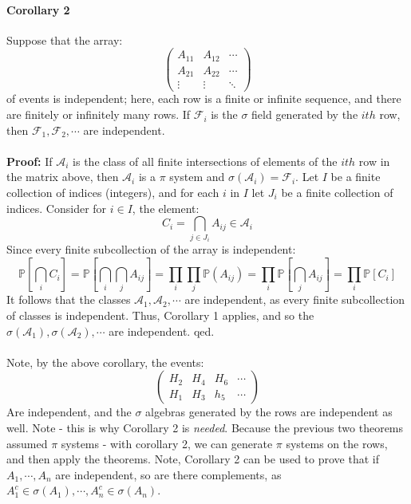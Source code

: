 \documentclass[12pt,a4paper]{article}
\newcommand{\1}[1]{\mathbbm{1}\left\{ #1 \right\}}
\newcommand{\acal}{\mathcal{A}}
\newcommand{\fcal}{\mathcal{F}}
\newcommand{\Prob}{\mathbb{P}}
\begin{document}
\paragraph{Corollary 2} Suppose that the array:
$$
	\begin{pmatrix}
	A_{11} & A_{12} & \cdots\\
	A_{21} & A_{22} & \cdots\\
	\vdots & \vdots & \ddots
	\end{pmatrix}
$$
of events is independent; here, each row is a finite or infinite sequence, and there are finitely or infinitely many rows. If $\fcal_i$ is the $\sigma$ field generated by the $ith$ row, then $\fcal_1, \fcal_2, \cdots$ are independent.
\\\\
\textbf{Proof:} If $\acal_i$ is the class of all finite intersections of elements of the $ith$ row in the matrix above, then $\acal_i$ is a $\pi$ system and $\sigma(\acal_i) = \fcal_i$. Let $I$ be a finite collection of indices (integers), and for each $i$ in $I$ let $J_i$ be a finite collection of indices. Consider for $i \in I$, the element:
$$
	C_i = \bigcap_{j \in J_i} A_{ij} \in \acal_i
$$
Since every finite subcollection of the array is independent:
$$
	\Prob\left[\bigcap_i C_i\right] =
	\Prob\left[\bigcap_i \bigcap_j A_{ij}\right] =
	\prod_i \prod_j \Prob(A_{ij}) = \prod_i \Prob\left[\bigcap_j A_{ij}\right] =
	\prod_i \Prob\left[C_i\right]
$$
It follows that the classes $\acal_1, \acal_2, \cdots$ are independent, as every finite subcollection of classes is independent. Thus, Corollary 1 applies, and so the $\sigma(\acal_1), \sigma(\acal_2), \cdots$ are independent. qed.
\\\\
Note, by the above corollary, the events:
$$
	\begin{pmatrix}
	H_2 & H_4 & H_6 & \cdots\\
	H_1 & H_3 & h_5 & \cdots
	\end{pmatrix}
$$
Are independent, and the $\sigma$ algebras generated by the rows are independent as well. Note - this is why Corollary 2 is \textit{needed}. Because the previous two theorems assumed $\pi$ systems - with corollary 2, we can generate $\pi$ systems on the rows, and then apply the theorems. Note, Corollary 2 can be used to prove that if $A_1, \cdots, A_n$ are independent, so are there complements, as $A_1^c \in \sigma(A_1), \cdots, A_n^c \in \sigma(A_n)$. 
\end{document}
